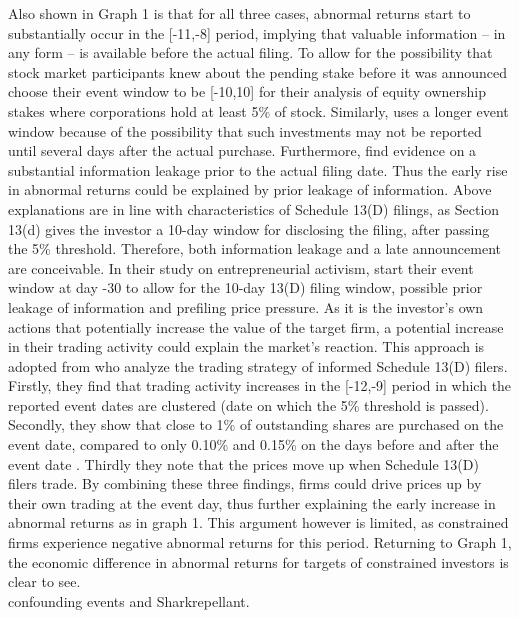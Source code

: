 \documentclass[12pt]{article}
\begin{document}
Also shown in Graph 1 is that for all three cases, abnormal returns start to substantially occur in the [-11,-8] period, implying that valuable information -- in any form -- is available before the actual filing. To allow for the possibility that stock market participants knew about the pending stake before it was announced \citet[p.2802]{Allen2000} choose their event window to be [-10,10] for their analysis of equity ownership stakes where corporations hold at least 5\% of stock. Similarly, \citep[p.87]{Liao2014} uses a longer event window because of the possibility that such investments may not be reported until several days after the actual purchase. Furthermore, \citet[p.31]{Brigida2012} find evidence on a substantial information leakage prior to the actual filing date. Thus the early rise in abnormal returns could be explained by prior leakage of information. Above explanations are in line with characteristics of Schedule 13(D) filings, as Section 13(d) gives the investor a 10-day window for disclosing the filing, after passing the 5\% threshold. Therefore, both information leakage and a late announcement are conceivable. In their study on entrepreneurial activism, \citet[p.207]{Klein2009} start their event window at day -30 to allow for the 10-day 13(D) filing window, possible prior leakage of information and prefiling price pressure. As it is the investor's own actions that potentially increase the value of the target firm, a potential increase in their trading activity could explain the market's reaction. This approach is adopted from  \citet[p.1561]{Collin-Dufresne2015} who analyze the trading strategy of informed Schedule 13(D) filers. Firstly, they find that trading activity increases in the [-12,-9] period in which the reported event dates are clustered (date on which the 5\% threshold is passed). Secondly, they show that close to 1\% of outstanding shares are purchased on the event date, compared to only 0.10\% and 0.15\% on the days before and after the event date \citep[p.1561]{Collin-Dufresne2015}. Thirdly they note that the prices move up when Schedule 13(D) filers trade. By combining these three findings, firms could drive prices up by their own trading at the event day, thus further explaining the early increase in abnormal returns as in graph 1. This argument however is limited, as constrained firms experience negative abnormal returns for this period. Returning to Graph 1, the economic difference in abnormal returns for targets of constrained investors is clear to see.\\ 
\citet{mcwilliams1999} confounding events and Sharkrepellant. 
\end{document}
